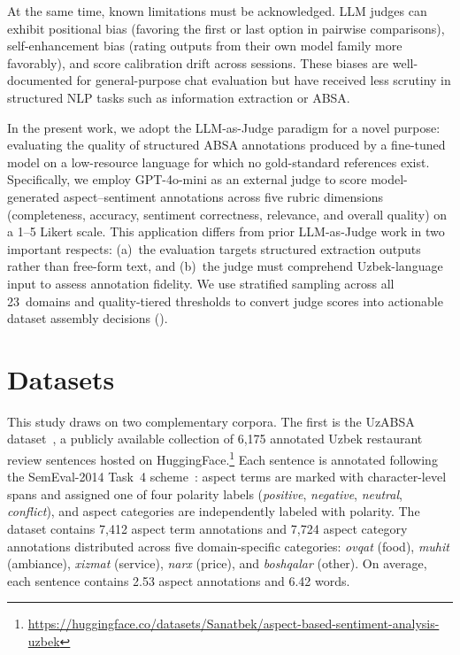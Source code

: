 \documentclass[runningheads]{llncs}
\begin{document}
At the same time, known limitations must be acknowledged. LLM judges can exhibit positional bias (favoring the first or last option in pairwise comparisons), self-enhancement bias (rating outputs from their own model family more favorably), and score calibration drift across sessions. These biases are well-documented for general-purpose chat evaluation but have received less scrutiny in structured NLP tasks such as information extraction or ABSA.

In the present work, we adopt the LLM-as-Judge paradigm for a novel purpose: evaluating the quality of structured ABSA annotations produced by a fine-tuned model on a low-resource language for which no gold-standard references exist. Specifically, we employ GPT-4o-mini as an external judge to score model-generated aspect--sentiment annotations across five rubric dimensions (completeness, accuracy, sentiment correctness, relevance, and overall quality) on a 1--5 Likert scale. This application differs from prior LLM-as-Judge work in two important respects: (a)~the evaluation targets structured extraction outputs rather than free-form text, and (b)~the judge must comprehend Uzbek-language input to assess annotation fidelity. We use stratified sampling across all 23~domains and quality-tiered thresholds to convert judge scores into actionable dataset assembly decisions ().


\section{Datasets}
\label{sec:datasets}
\label{sec:data_annotated}

This study draws on two complementary corpora. The first is the UzABSA dataset~\cite{matlatipov2024uzabsa}, a publicly available collection of 6{,}175 annotated Uzbek restaurant review sentences hosted on HuggingFace.\footnote{\url{https://huggingface.co/datasets/Sanatbek/aspect-based-sentiment-analysis-uzbek}} Each sentence is annotated following the SemEval-2014 Task~4 scheme~\cite{pontiki-etal-2014-semeval}: aspect terms are marked with character-level spans and assigned one of four polarity labels (\textit{positive}, \textit{negative}, \textit{neutral}, \textit{conflict}), and aspect categories are independently labeled with polarity. The dataset contains 7{,}412 aspect term annotations and 7{,}724 aspect category annotations distributed across five domain-specific categories: \textit{ovqat} (food), \textit{muhit} (ambiance), \textit{xizmat} (service), \textit{narx} (price), and \textit{boshqalar} (other). On average, each sentence contains 2.53 aspect annotations and 6.42 words.
\end{document}
